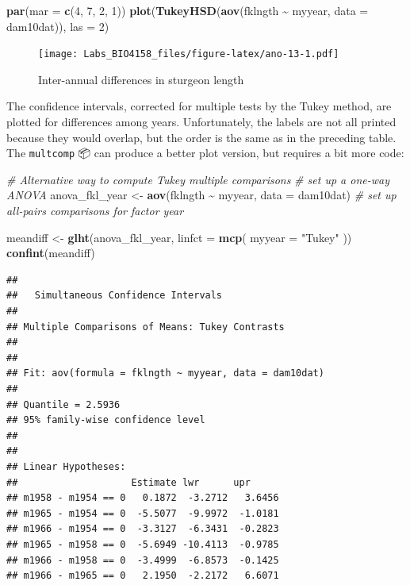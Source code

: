 \documentclass[
  12pt,
]{book}
\newenvironment{Shaded}{\begin{snugshade}}{\end{snugshade}}
\newcommand{\CommentTok}[1]{\textcolor[rgb]{0.56,0.35,0.01}{\textit{#1}}}
\newcommand{\DataTypeTok}[1]{\textcolor[rgb]{0.13,0.29,0.53}{#1}}
\newcommand{\DecValTok}[1]{\textcolor[rgb]{0.00,0.00,0.81}{#1}}
\newcommand{\KeywordTok}[1]{\textcolor[rgb]{0.13,0.29,0.53}{\textbf{#1}}}
\newcommand{\NormalTok}[1]{#1}
\newcommand{\OperatorTok}[1]{\textcolor[rgb]{0.81,0.36,0.00}{\textbf{#1}}}
\newcommand{\StringTok}[1]{\textcolor[rgb]{0.31,0.60,0.02}{#1}}
\begin{document}
\begin{Shaded}
\begin{Highlighting}[]
\KeywordTok{par}\NormalTok{(}\DataTypeTok{mar =} \KeywordTok{c}\NormalTok{(}\DecValTok{4}\NormalTok{, }\DecValTok{7}\NormalTok{, }\DecValTok{2}\NormalTok{, }\DecValTok{1}\NormalTok{))}
\KeywordTok{plot}\NormalTok{(}\KeywordTok{TukeyHSD}\NormalTok{(}\KeywordTok{aov}\NormalTok{(fklngth }\OperatorTok{\textasciitilde{}}\StringTok{ }\NormalTok{myyear, }\DataTypeTok{data =}\NormalTok{ dam10dat)), }\DataTypeTok{las =} \DecValTok{2}\NormalTok{)}
\end{Highlighting}
\end{Shaded}

\begin{figure}
\centering
\texttt{[image: Labs\_BIO4158\_files/figure-latex/ano-13-1.pdf]}
\caption{\label{fig:ano-13}Inter-annual differences in sturgeon length}
\end{figure}

The confidence intervals, corrected for multiple tests by the Tukey method, are plotted for differences among years. Unfortunately, the labels are not all printed because they would overlap, but the order is the same as in the preceding table. The \texttt{multcomp} 📦 can produce a better plot version, but requires a bit more code:

\begin{Shaded}
\begin{Highlighting}[]
\CommentTok{\# Alternative way to compute Tukey multiple comparisons}
\CommentTok{\# set up a one{-}way ANOVA}
\NormalTok{anova\_fkl\_year \textless{}{-}}\StringTok{ }\KeywordTok{aov}\NormalTok{(fklngth }\OperatorTok{\textasciitilde{}}\StringTok{ }\NormalTok{myyear, }\DataTypeTok{data =}\NormalTok{ dam10dat)}
\CommentTok{\# set up all{-}pairs comparisons for factor \textasciigrave{}year\textquotesingle{}}

\NormalTok{meandiff \textless{}{-}}\StringTok{ }\KeywordTok{glht}\NormalTok{(anova\_fkl\_year, }\DataTypeTok{linfct =} \KeywordTok{mcp}\NormalTok{(}
  \DataTypeTok{myyear =}
    \StringTok{"Tukey"}
\NormalTok{))}
\KeywordTok{confint}\NormalTok{(meandiff)}
\end{Highlighting}
\end{Shaded}

\begin{verbatim}
## 
##   Simultaneous Confidence Intervals
## 
## Multiple Comparisons of Means: Tukey Contrasts
## 
## 
## Fit: aov(formula = fklngth ~ myyear, data = dam10dat)
## 
## Quantile = 2.5936
## 95% family-wise confidence level
##  
## 
## Linear Hypotheses:
##                    Estimate lwr      upr     
## m1958 - m1954 == 0   0.1872  -3.2712   3.6456
## m1965 - m1954 == 0  -5.5077  -9.9972  -1.0181
## m1966 - m1954 == 0  -3.3127  -6.3431  -0.2823
## m1965 - m1958 == 0  -5.6949 -10.4113  -0.9785
## m1966 - m1958 == 0  -3.4999  -6.8573  -0.1425
## m1966 - m1965 == 0   2.1950  -2.2172   6.6071
\end{verbatim}
\end{document}
